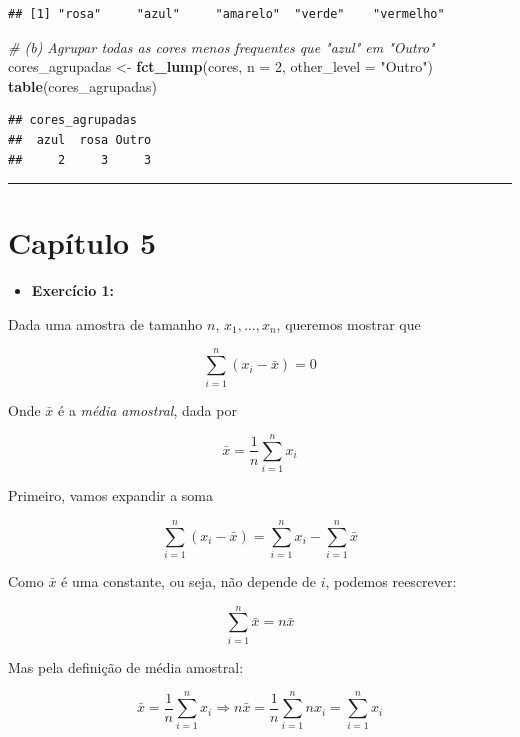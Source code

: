 \documentclass[
]{book}
\newenvironment{Shaded}{\begin{snugshade}}{\end{snugshade}}
\newcommand{\AttributeTok}[1]{\textcolor[rgb]{0.13,0.29,0.53}{#1}}
\newcommand{\CommentTok}[1]{\textcolor[rgb]{0.56,0.35,0.01}{\textit{#1}}}
\newcommand{\DecValTok}[1]{\textcolor[rgb]{0.00,0.00,0.81}{#1}}
\newcommand{\FunctionTok}[1]{\textcolor[rgb]{0.13,0.29,0.53}{\textbf{#1}}}
\newcommand{\NormalTok}[1]{#1}
\newcommand{\OtherTok}[1]{\textcolor[rgb]{0.56,0.35,0.01}{#1}}
\newcommand{\StringTok}[1]{\textcolor[rgb]{0.31,0.60,0.02}{#1}}
\providecommand{\tightlist}{%
  \setlength{\itemsep}{0pt}\setlength{\parskip}{0pt}}
\begin{document}
\begin{verbatim}
## [1] "rosa"     "azul"     "amarelo"  "verde"    "vermelho"
\end{verbatim}

\begin{Shaded}
\begin{Highlighting}[]
\CommentTok{\# (b) Agrupar todas as cores menos frequentes que "azul" em "Outro"}
\NormalTok{cores\_agrupadas }\OtherTok{\textless{}{-}} \FunctionTok{fct\_lump}\NormalTok{(cores, }\AttributeTok{n =} \DecValTok{2}\NormalTok{, }\AttributeTok{other\_level =} \StringTok{"Outro"}\NormalTok{)}
\FunctionTok{table}\NormalTok{(cores\_agrupadas)}
\end{Highlighting}
\end{Shaded}

\begin{verbatim}
## cores_agrupadas
##  azul  rosa Outro 
##     2     3     3
\end{verbatim}

\begin{center}\rule{0.5\linewidth}{0.5pt}\end{center}

\section{Capítulo 5}\label{capuxedtulo-5}

\begin{itemize}
\tightlist
\item
  \textbf{Exercício 1:}
\end{itemize}

Dada uma amostra de tamanho \(n\), \(x_1,\ldots,x_n\), queremos mostrar que

\[
\sum_{i=1}^n (x_i - \bar{x}) = 0
\]

Onde \(\bar{x}\) é a \emph{média amostral}, dada por

\[
\bar{x} = \frac{1}{n}\sum_{i=1}^n x_i 
\]

Primeiro, vamos expandir a soma

\[
\sum_{i=1}^n (x_i - \bar{x}) = \sum_{i=1}^n x_i - \sum_{i=1}^n \bar{x}
\]

Como \(\bar{x}\) é uma constante, ou seja, não depende de \(i\), podemos reescrever:

\[
\sum_{i=1}^n \bar{x} = n \bar{x}
\]

Mas pela definição de média amostral:

\[
\bar{x} = \frac{1}{n}\sum_{i=1}^n x_i  
  \Rightarrow
n \bar{x} = \frac{1}{n}\sum_{i=1}^n nx_i= \sum_{i=1}^n x_i 
\]
\end{document}
